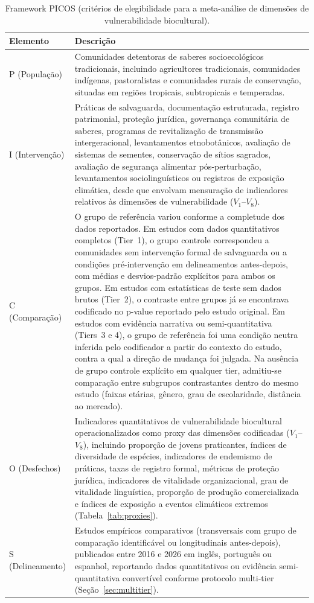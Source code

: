 \documentclass[12pt,a4paper]{article}
\begin{document}
\begin{table}[htbp]
\caption{Framework PICOS (critérios de elegibilidade para a meta-análise de dimensões de vulnerabilidade biocultural).}
\label{tab:picos}
\centering
\small
\begin{tabular}{p{3.5cm} p{9.5cm}}
\toprule
\textbf{Elemento} & \textbf{Descrição} \\
\midrule
P (População) & Comunidades detentoras de saberes socioecológicos tradicionais, incluindo agricultores tradicionais, comunidades indígenas, pastoralistas e comunidades rurais de conservação, situadas em regiões tropicais, subtropicais e temperadas. \\
I (Intervenção) & Práticas de salvaguarda, documentação estruturada, registro patrimonial, proteção jurídica, governança comunitária de saberes, programas de revitalização de transmissão intergeracional, levantamentos etnobotânicos, avaliação de sistemas de sementes, conservação de sítios sagrados, avaliação de segurança alimentar pós-perturbação, levantamentos sociolinguísticos ou registros de exposição climática, desde que envolvam mensuração de indicadores relativos às dimensões de vulnerabilidade ($V_1$--$V_8$). \\
C (Comparação) & O grupo de referência variou conforme a completude dos dados reportados. Em estudos com dados quantitativos completos (Tier~1), o grupo controle correspondeu a comunidades sem intervenção formal de salvaguarda ou a condições pré-intervenção em delineamentos antes-depois, com médias e desvios-padrão explícitos para ambos os grupos. Em estudos com estatísticas de teste sem dados brutos (Tier~2), o contraste entre grupos já se encontrava codificado no p-value reportado pelo estudo original. Em estudos com evidência narrativa ou semi-quantitativa (Tiers~3 e 4), o grupo de referência foi uma condição neutra inferida pelo codificador a partir do contexto do estudo, contra a qual a direção de mudança foi julgada. Na ausência de grupo controle explícito em qualquer tier, admitiu-se comparação entre subgrupos contrastantes dentro do mesmo estudo (faixas etárias, gênero, grau de escolaridade, distância ao mercado). \\
O (Desfechos) & Indicadores quantitativos de vulnerabilidade biocultural operacionalizados como proxy das dimensões codificadas ($V_1$--$V_8$), incluindo proporção de jovens praticantes, índices de diversidade de espécies, indicadores de endemismo de práticas, taxas de registro formal, métricas de proteção jurídica, indicadores de vitalidade organizacional, grau de vitalidade linguística, proporção de produção comercializada e índices de exposição a eventos climáticos extremos (Tabela~\ref{tab:proxies}). \\
S (Delineamento) & Estudos empíricos comparativos (transversais com grupo de comparação identificável ou longitudinais antes-depois), publicados entre 2016 e 2026 em inglês, português ou espanhol, reportando dados quantitativos ou evidência semi-quantitativa convertível conforme protocolo multi-tier (Seção~\ref{sec:multitier}). \\
\bottomrule
\end{tabular}
\end{table}
\end{document}
